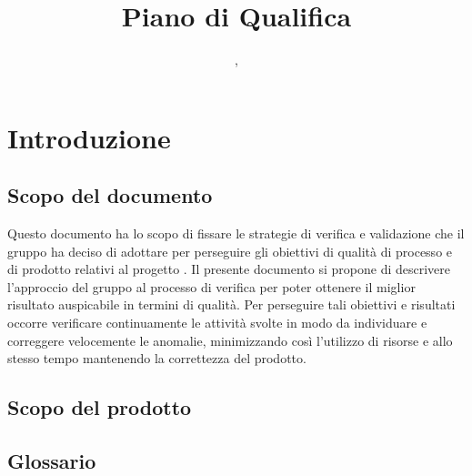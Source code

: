 

\usepackage{float}
\usepackage{varwidth}

\author{\LS, \AZ}
\supervisor{\GG}
\dest{\TV, \RC, \ZU}
\title{Piano di Qualifica}

\newcommand\ambito[2]{%
	\multirow{#1}*{%
		\begin{varwidth}{3cm}%
		#2%
		\end{varwidth}}}




\maketitle

\tableofcontents




\section{Introduzione}
	\subsection{Scopo del documento}
	Questo documento ha lo scopo di fissare le strategie di verifica e validazione che il gruppo \hx{} ha deciso di adottare per perseguire gli obiettivi di qualità di processo e di prodotto relativi al progetto \proj. Il presente documento si propone di descrivere l'approccio del gruppo al processo di verifica per poter ottenere il miglior risultato auspicabile in termini di qualità. Per perseguire tali obiettivi e risultati occorre verificare continuamente le attività svolte in modo da individuare e correggere velocemente le anomalie, minimizzando così l'utilizzo di risorse e allo stesso tempo mantenendo la correttezza del prodotto.

	\subsection{Scopo del prodotto}
	\scopo
	
	\subsection{Glossario}
	\presgloss
	
